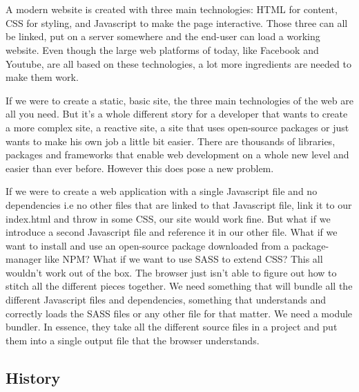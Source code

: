 \chapter{}
\label{ch:stand-van-zaken}



A modern website is created with three main technologies: HTML for content, CSS for styling, and Javascript to make the page interactive. Those three can all be linked, put on a server somewhere and the end-user can load a working website. Even though the large web platforms of today, like Facebook and Youtube, are all based on these technologies, a lot more ingredients are needed to make them work.

If we were to create a static, basic site, the three main technologies of the web are all you need. But it’s a whole different story for a developer that wants to create a more complex site, a reactive site, a site that uses open-source packages or just wants to make his own job a little bit easier. There are thousands of libraries, packages and frameworks that enable web development on a whole new level and easier than ever before. However this does pose a new problem. 

If we were to create a web application with a single Javascript file and no dependencies i.e no other files that are linked to that Javascript file, link it to our index.html and throw in some CSS, our site would work fine. But what if we introduce a second Javascript file and reference it in our other file. What if we want to install and use an open-source package downloaded from a package-manager like NPM? What if we want to use SASS to extend CSS? This all wouldn’t work out of the box. The browser just isn’t able to figure out how to stitch all the different pieces together.
We need something that will bundle all the different Javascript files and dependencies, something that understands and correctly loads the SASS files or any other file for that matter. We need a module bundler. In essence, they take all the different source files in a project and put them into a single output file that the browser understands. 

\section{History}

